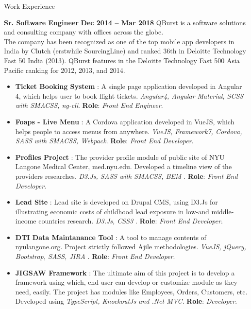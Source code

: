 \documentclass{resume}
\begin{document}
\begin{category}{Work Experience}
  
  \citemnobullet \textbf{Sr. Software Engineer} \hfill \textbf{Dec 2014 -- Mar 2018}
  \citemnobullet QBurst is a software solutions and consulting company with offices across the globe.
\\The company has been recognized as one of the top mobile app developers in India by Clutch (erstwhile SourcingLine) and ranked 36th in Deloitte Technology Fast 50 India (2013). QBurst features in the Deloitte Technology Fast 500 Asia Pacific ranking for 2012, 2013, and 2014.
  \begin{itemize}
  \item \textbf{Ticket Booking System} : A single page application developed in Angular 4, which helps user to book flight tickets. {\em Angular4, Angular Material, SCSS with SMACSS, ng-cli}. \textbf{Role}: {\em Front End Engineer}. 
  \item \textbf{Foaps - Live Menu} : A Cordova application developed in VueJS, which helps people to access menus from anywhere. {\em VueJS, Framework7, Cordova, SASS with SMACSS, Webpack}. \textbf{Role}: {\em Front End Developer}. 
  \item \textbf{Profiles Project} : The provider profile module of public site of NYU Langone Medical Center, med.nyu.edu. Developed a timeline view of the providers researches. {\em D3.Js, SASS with SMACSS, BEM }. \textbf{Role}: {\em Front End Developer}. 
  \item \textbf{Lead Site} : Lead site is developed on Drupal CMS, using D3.Js for illustrating economic costs of childhood lead exposure in low-and middle-income countries research. {\em D3.Js, CSS3 }. \textbf{Role}: {\em Front End Developer}. 
  \item \textbf{DTI Data Maintanance Tool} : A tool to manage contents of nyulangone.org. Project strictly followed Ajile methodologies. {\em VueJS, jQuery, Bootstrap, SASS, JIRA }. \textbf{Role}: {\em Front End Developer}. 
  \item \textbf{JIGSAW Framework} : The ultimate aim of this project is to develop a framework using which, end user can develop  or customize module as they need, easily. The project has modules like Employees, Orders, Customers, etc. Developed using {\em TypeScript, KnockoutJs and .Net MVC}. \textbf{Role}: {\em Developer}.
  \end{itemize}


\end{category}
\end{document}
